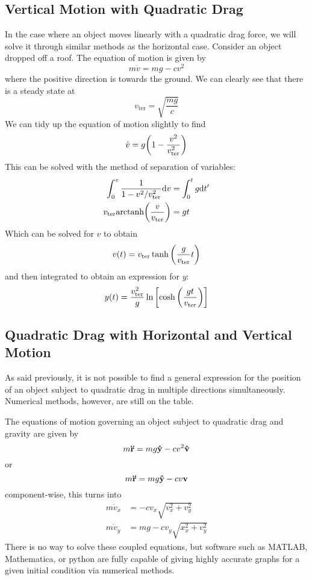 \subsection*{Vertical Motion with Quadratic Drag}
In the case where an object moves linearly with a quadratic drag force, we will solve it through similar methods as the horizontal case. Consider an object dropped off a roof. The equation of motion is given by
\[ m\dot v = mg - cv^2 \]
where the positive direction is towards the ground. We can clearly see that there is a steady state at
\[ v_{\text{ter}} = \sqrt{\frac{mg}{c}} \]
We can tidy up the equation of motion slightly to find
\[ \dot v = g\pqty{1 - \frac{v^2}{v_{\text{ter}}^2}}\]
This can be solved with the method of separation of variables:
\begin{align*}
    \int_{0}^v \frac{1}{1-v^2/v_\text{ter}^2}\dd v &= \int_0^t g\dd t' \\
    v_\text{ter}\pfn{arctanh}\pqty{\frac{v}{v_\text{ter}}} &= gt
\end{align*}
Which can be solved for $v$ to obtain 
\[ v(t) = v_\text{ter}\tanh\pqty{\frac{g}{v_\text{ter}}t}\]
and then integrated to obtain an expression for $y$:
\[ y(t) = \frac{v_\text{ter}^2}{g}\ln\bqty{\cosh\pqty{\frac{gt}{v_\text{ter}}}}\]
\subsection*{Quadratic Drag with Horizontal and Vertical Motion}
As said previously, it is not possible to find a general expression for the position of an object subject to quadratic drag in multiple directions simultaneously. Numerical methods, however, are still on the table.

The equations of motion governing an object subject to quadratic drag and gravity are given by
\[ m\mathbf{\ddot r} = mg\mathbf{\hat{y}} - cv^2\mathbf{\hat v}\]
or
\[ m\mathbf{\ddot r} = mg\mathbf{\hat{y}} - cv\mathbf{v}\]
component-wise, this turns into
\begin{align*}
    m\dot v_x &= -cv_x\sqrt{v_x^2+v_y^2} \\
    m\dot v_y &= mg - cv_y\sqrt{x_x^2+v_y^2} 
\end{align*}
There is no way to solve these coupled equations, but software such as MATLAB, Mathematica, or python are fully capable of giving highly accurate graphs for a given initial condition via numerical methods.
